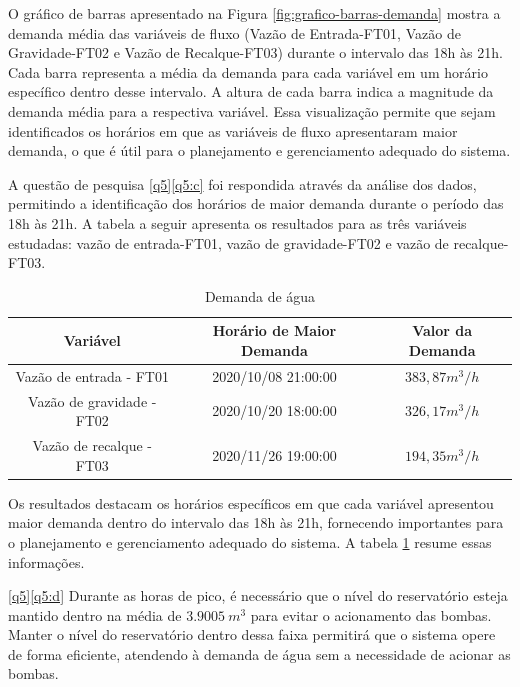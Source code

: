 O gráfico de barras apresentado na Figura \ref{fig:grafico-barras-demanda} mostra a demanda média das variáveis de fluxo (Vazão de Entrada-FT01, Vazão de Gravidade-FT02 e Vazão de Recalque-FT03) durante o intervalo das 18h às 21h. Cada barra representa a média da demanda para cada variável em um horário específico dentro desse intervalo. A altura de cada barra indica a magnitude da demanda média para a respectiva variável. Essa visualização permite que sejam identificados os horários em que as variáveis de fluxo apresentaram maior demanda, o que é útil para o planejamento e gerenciamento adequado do sistema.

A questão de pesquisa \ref{q5}\ref{q5:c} foi respondida através da análise dos dados, permitindo a identificação dos horários de maior demanda durante o período das 18h às 21h. A tabela a seguir apresenta os resultados para as três variáveis estudadas: vazão de entrada-FT01, vazão de gravidade-FT02 e vazão de recalque-FT03.




\begin{table}[H]
	\centering
	\caption{Demanda de água}\label{tb:dem}
	\begin{tabular}{@{}ccc@{}}
		\toprule
		\textbf{Variável}         & \textbf{Horário de Maior Demanda} & \textbf{Valor da Demanda} \\ \midrule
		Vazão de entrada - FT01   & 2020/10/08 21:00:00               & $383,87 m^3/h$                   \\
		Vazão de gravidade - FT02 & 2020/10/20 18:00:00               & $326,17 m^3/h$                    \\
		Vazão de recalque - FT03  & 2020/11/26 19:00:00               & $194,35 m^3/h$                    \\ \bottomrule
	\end{tabular}
	
	
\end{table}

Os resultados destacam os horários específicos em que cada variável apresentou maior demanda dentro do intervalo das 18h às 21h, fornecendo importantes para o planejamento e gerenciamento adequado do sistema. A tabela \ref{tb:dem} resume essas informações.


\eqref{q5}\ref{q5:d} Durante as horas de pico, é necessário que o nível do reservatório esteja mantido dentro na média de $3.9005 \ m^3$ para evitar o acionamento das bombas. Manter o nível do reservatório dentro dessa faixa permitirá que o sistema opere de forma eficiente, atendendo à demanda de água sem a necessidade de acionar as bombas.

